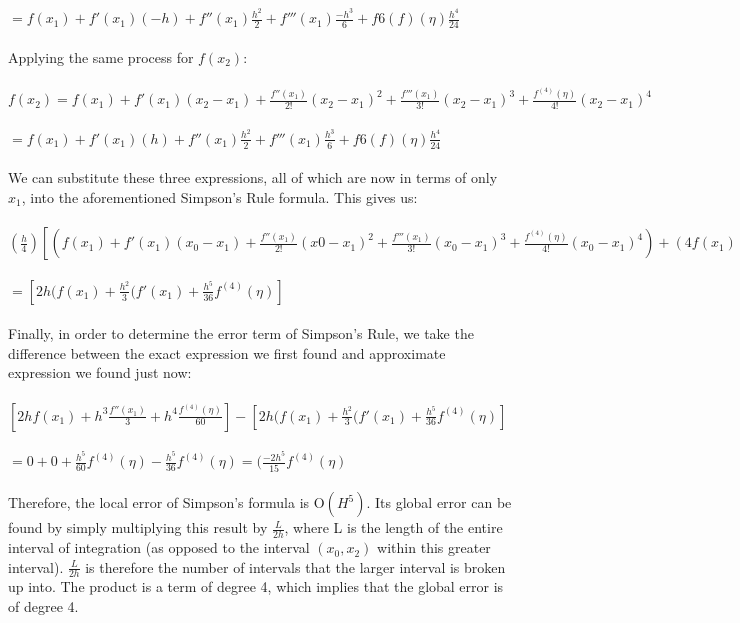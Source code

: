 \documentclass{article}
\begin{document}
$
= f(x_1) + f'(x_1)(-h) + f''(x_1)\frac{h^2}{2} + f'''(x_1)\frac{-h^3}{6} + f6{(f)}(\eta)\frac{h^4}{24}
$
\\
\\
Applying the same process for $f(x_2)$:
\\
\\
$
f(x_2) = f(x_1) + f'(x_1)(x_2 - x_1) + \frac{f''(x_1)}{2!}(x_2 - x_1)^2 + \frac{f'''(x_1)}{3!}(x_2 - x_1)^3 + \frac{f^{(4)}(\eta)}{4!}(x_2 - x_1)^4
$
\\
\\
$
= f(x_1) + f'(x_1)(h) + f''(x_1)\frac{h^2}{2} + f'''(x_1)\frac{h^3}{6} + f6{(f)}(\eta)\frac{h^4}{24}
$
\\
\\
We can substitute these three expressions, all of which are now in terms of only $x_1$, into the aforementioned Simpson's Rule formula. This gives us:
\\
\\
$
(\frac{h}{4})[(f(x_1) + f'(x_1)(x_0 - x_1) + \frac{f''(x_1)}{2!}(x0 - x_1)^2 + \frac{f'''(x_1)}{3!}(x_0 - x_1)^3 + \frac{f^{(4)}(\eta)}{4!}(x_0 - x_1)^4) + (4f(x_1)) + (f(x_2) = f(x_1) + f'(x_1)(x_2 - x_1) + \frac{f''(x_1)}{2!}(x_2 - x_1)^2 + \frac{f'''(x_1)}{3!}(x_2 - x_1)^3 + \frac{f^{(4)}(\eta)}{4!}(x_2 - x_1)^4)]
$
\\
\\
$
= [2h(f(x_1) + \frac{h^2}{3}(f'(x_1) + \frac{h^5}{36}f^{(4)}(\eta)]
$
\\
\\
Finally, in order to determine the error term of Simpson's Rule, we take the difference between the exact expression we first found and approximate expression we found just now:
\\
\\
$
[2hf(x_1) + h^3\frac{f''(x_1)}{3} + h^4\frac{f^{(4)}(\eta)}{60}] - [2h(f(x_1) + \frac{h^2}{3}(f'(x_1) + \frac{h^5}{36}f^{(4)}(\eta)]
$
\\
\\
$
 = 0 + 0 + \frac{h^5}{60}f^{(4)}(\eta) - \frac{h^5}{36}f^{(4)}(\eta) = (\frac{-2h^5}{15}f^{(4)}(\eta) 
$
 \\
 \\
 Therefore, the local error of Simpson's formula is O$(H^5)$. Its global error can be found by simply multiplying this result by $\frac{L}{2h}$, where L is the length of the entire interval of integration (as opposed to the interval $(x_0, x_2)$ within this greater interval). $\frac{L}{2h}$ is therefore the number of intervals that the larger interval is broken up into. The product is a term of degree 4, which implies that the global error is of degree 4. 
\end{document}
